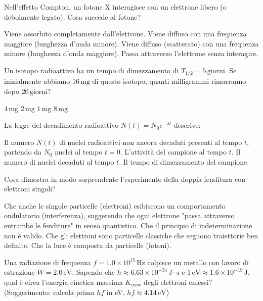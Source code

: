 \documentclass{exam}%
\begin{document}
\begin{questions}%
\question Nell'effetto Compton, un fotone X interagisce con un elettrone libero (o debolmente legato). Cosa succede al fotone?%
\vspace{0.2em}%
\begin{choices}%
\choice Viene assorbito completamente dall'elettrone.%
\choice Viene diffuso con una frequenza maggiore (lunghezza d'onda minore).%
\choice Viene diffuso (scatterato) con una frequenza minore (lunghezza d'onda maggiore).%
\choice Passa attraverso l'elettrone senza interagire.%
\end{choices}%
\question Un isotopo radioattivo ha un tempo di dimezzamento di $T_{1/2} = 5 \, \text{giorni}$. Se inizialmente abbiamo $16 \, \text{mg}$ di questo isotopo, quanti milligrammi rimarranno dopo $20 \, \text{giorni}$?%
\vspace{0.2em}%
\begin{multicols}{4}%
\begin{choices}%
\choice $4 \, \text{mg}$%
\choice $2 \, \text{mg}$%
\choice $1 \, \text{mg}$%
\choice $8 \, \text{mg}$%
\end{choices}%
\end{multicols}%
\question La legge del decadimento radioattivo $N(t) = N_0 e^{-\lambda t}$ descrive:%
\vspace{0.2em}%
\begin{choices}%
\choice Il numero $N(t)$ di nuclei radioattivi non ancora decaduti presenti al tempo $t$, partendo da $N_0$ nuclei al tempo $t=0$.%
\choice L'attività del campione al tempo $t$.%
\choice Il numero di nuclei decaduti al tempo $t$.%
\choice Il tempo di dimezzamento del campione.%
\end{choices}%
\question Cosa dimostra in modo sorprendente l'esperimento della doppia fenditura con elettroni singoli?%
\vspace{0.2em}%
\begin{choices}%
\choice Che anche le singole particelle (elettroni) esibiscono un comportamento ondulatorio (interferenza), suggerendo che ogni elettrone "passa attraverso entrambe le fenditure" in senso quantistico.%
\choice Che il principio di indeterminazione non è valido.%
\choice Che gli elettroni sono particelle classiche che seguono traiettorie ben definite.%
\choice Che la luce è composta da particelle (fotoni).%
\end{choices}%
\question Una radiazione di frequenza $f = 1.0 \times 10^{15} \, \text{Hz}$ colpisce un metallo con lavoro di estrazione $W = 2.0 \, \text{eV}$. Sapendo che $h \approx 6.63 \times 10^{-34} \, \text{J} \cdot \text{s}$ e $1 \, \text{eV} \approx 1.6 \times 10^{-19} \, \text{J}$, qual è circa l'energia cinetica massima $K_{max}$ degli elettroni emessi? (Suggerimento: calcola prima $hf$ in eV, $hf \approx 4.14 \, \text{eV}$)%

\end{questions}
\end{document}

